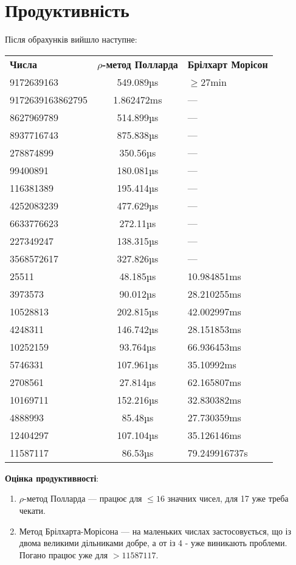 \vspace{40mm}
\section{Продуктивність}
\vspace{3mm}
Після обрахунків вийшло наступне:

\begin{tabularx}{\textwidth}{||l|c|l||}
  \textbf{Числа} & \textbf{$\rho$-метод Полларда} & \textbf{Брілхарт Морісон} \\
9172639163 & 549.089µs & $\geqslant27$min\\
9172639163862795 & 1.862472ms & ---\\
8627969789 & 514.899µs & ---\\
8937716743 & 875.838µs & ---\\
278874899 & 350.56µs & ---\\
99400891 & 180.081µs & ---\\
116381389 & 195.414µs & ---\\
4252083239 & 477.629µs & ---\\
6633776623 & 272.11µs & ---\\
227349247 & 138.315µs & ---\\
3568572617 & 327.826µs & ---\\
25511 & 48.185µs & 10.984851ms\\
3973573 & 90.012µs & 28.210255ms\\
10528813 & 202.815µs & 42.002997ms\\
4248311 & 146.742µs & 28.151853ms\\
10252159 & 93.764µs & 66.936453ms\\
5746331 & 107.961µs & 35.10992ms\\
2708561 & 27.814µs & 62.165807ms\\
10169711 & 152.216µs & 32.830382ms\\
4888993 & 85.48µs & 27.730359ms\\
12404297 & 107.104µs & 35.126146ms\\
11587117 & 86.53µs & 79.249916737s\\
\end{tabularx}

\vspace{5mm}
\textbf{Оцінка продуктивності}:
\begin{enumerate}
\item $\rho$-метод Полларда --- працює для $\leqslant16$ значних чисел, для 17 уже треба чекати.
\item Метод Брілхарта-Морісона --- на маленьких числах застосовується, що із двома великими дільниками добре, а от із 4 - уже виникають проблеми.
Погано працює уже для $>11587117$.
\end{enumerate} 

